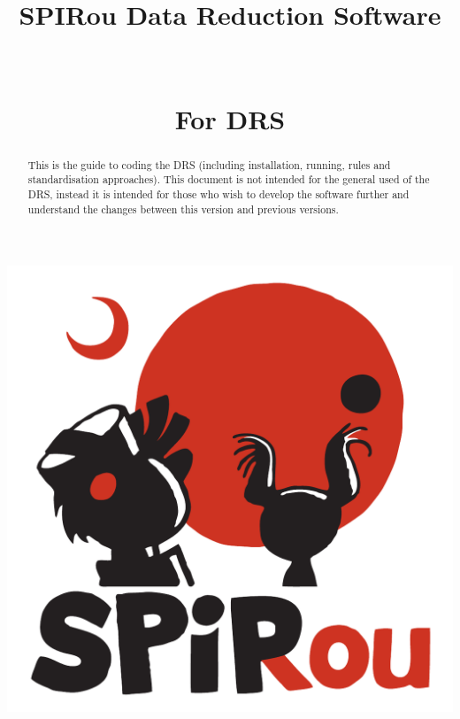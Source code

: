 \documentclass[
a4paper, %
10pt, %
onecolumn, %
openany, %
]{memoir}
\author{\MyAuthors}
\title{{\Huge SPIRou Data Reduction Software} \vspace{1cm} \\ \HUGE{Developer Guide} \\ {\small \MyVersionDev} \\ For DRS \instrument \MyCodeVersion}
\date{\MyDateDev}
\begin{document}
\frontmatter

\maketitle

\vspace{1cm}
\begin{center}
\includegraphics[width=.5\textwidth]{Figures/Logo_SPIRou-22.pdf}
\end{center}
\vspace{1cm}

\begin{abstract}
\noindent This is the guide to coding the DRS (including installation, running, rules and standardisation approaches). This document is not intended for the general used of the DRS, instead it is intended for those who wish to develop the software further and understand the changes between this version and previous versions.
\end{abstract}
\clearpage
\newpage

\tableofcontents*


\clearpage


\mainmatter









\end{document}
